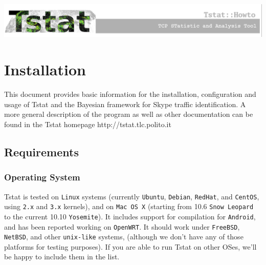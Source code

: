 \documentclass[11pt]{article}
\begin{document}
\begin{center}
    \includegraphics[width=\textwidth]{tstat_banner.eps}
\end{center}
\tableofcontents



\clearpage

       \selectfont


\section{Installation\label{Installation}}


This document provides basic information
for the installation, configuration and usage 
of Tstat and the Bayesian framework for Skype
traffic identification.  A more general
description of the program as well as other
documentation can be found in the Tstat homepage
\textsf{http://tstat.tlc.polito.it}

\subsection{Requirements\label{Requirements}}
\subsubsection{Operating System\label{Operating_System}}


Tstat is tested on \texttt{Linux} systems (currently \texttt{Ubuntu}, \texttt{Debian}, \texttt{RedHat}, 
and \texttt{CentOS}, using \texttt{2.x} and \texttt{3.x} kernels), and on \texttt{Mac OS X} (starting 
from 10.6 \texttt{Snow Leopard} to the current 10.10 \texttt{Yosemite}). 
It includes support for compilation for \texttt{Android}, and has been reported working on 
\texttt{OpenWRT}. 
It should work under \texttt{FreeBSD}, \texttt{NetBSD}, and other \texttt{unix-like} systems, 
(although we don't have any of those platforms for testing purposes). 
If you are able to run Tstat on other OSes, we'll be happy to include them in the list.
\end{document}
